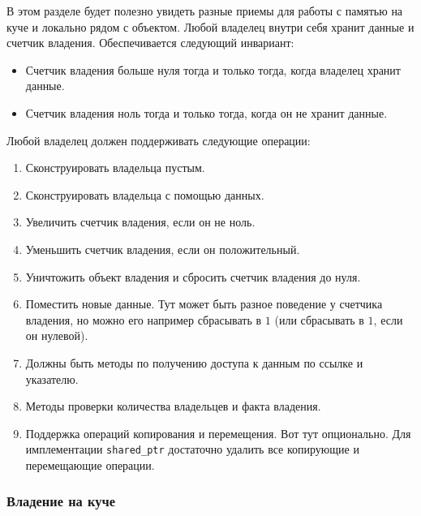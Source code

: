 В этом разделе будет полезно увидеть разные приемы для работы с памятью на куче и локально рядом с объектом.
Любой владелец внутри себя хранит данные и счетчик владения.
Обеспечивается следующий инвариант:
\begin{itemize}
\item Счетчик владения больше нуля тогда и только тогда, когда владелец хранит данные.

\item Счетчик владения ноль тогда и только тогда, когда он не хранит данные.
\end{itemize}
Любой владелец должен поддерживать следующие операции:
\begin{enumerate}
\item Сконструировать владельца пустым.

\item Сконструировать владельца с помощью данных.

\item Увеличить счетчик владения, если он не ноль.

\item Уменьшить счетчик владения, если он положительный.

\item Уничтожить объект владения и сбросить счетчик владения до нуля.

\item Поместить новые данные. Тут может быть разное поведение у счетчика владения, но можно его например сбрасывать в $1$ (или сбрасывать в $1$, если он нулевой).

\item Должны быть методы по получению доступа к данным по ссылке и указателю.

\item Методы проверки количества владельцев и факта владения.

\item Поддержка операций копирования и перемещения.
Вот тут опционально.
Для имплементации \verb"shared_ptr" достаточно удалить все копирующие и перемещающие операции.
\end{enumerate}


\subsubsection{Владение на куче}

